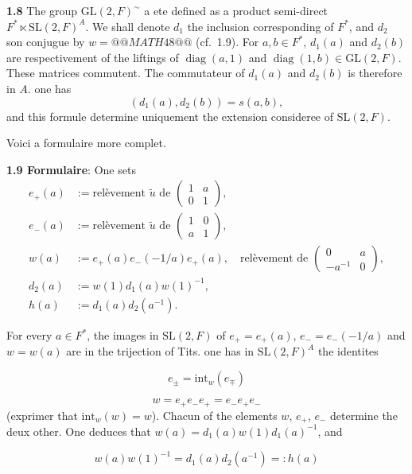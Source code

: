 \documentclass[12pt,a4paper]{article}
\theoremstyle{plain}
\theoremstyle{definition}
\theoremstyle{remark}
\DeclareMathOperator{\diag}{diag}
\newcommand{\wt}{\widetilde}
\begin{document}
\textbf{1.8} The group $\mathrm{GL}(2, F)^\sim$ a ete defined as a product semi-direct $F^* \ltimes \mathrm{SL}(2, F)^A$. We shall denote $d_1$ the inclusion corresponding of $F^*$, and $d_2$ son conjugue by $w = @@MATH48@@$ (cf.\ 1.9). For $a, b \in F^*$, $d_1(a)$ and $d_2(b)$ are respectivement of the liftings of $\diag(a, 1)$ and $\diag(1, b) \in \mathrm{GL}(2, F)$. These matrices commutent. The commutateur of $d_1(a)$ and $d_2(b)$ is therefore in $A$. one has
\[
(d_1(a), d_2(b)) = s(a, b),
\]
and this formule determine uniquement the extension consideree of $\mathrm{SL}(2, F)$.

Voici a formulaire more complet.

\textbf{1.9 Formulaire}: One sets
\begin{align*}
e_+(a) &:= \text{relèvement } \wt{u} \text{ de } \begin{pmatrix} 1 & a \\ 0 & 1 \end{pmatrix},\\
e_-(a) &:= \text{relèvement } \wt{u} \text{ de } \begin{pmatrix} 1 & 0 \\ a & 1 \end{pmatrix},\\
w(a) &:= e_+(a) e_-(-1/a) e_+(a), \quad \text{relèvement de } \begin{pmatrix} 0 & a \\ -a^{-1} & 0 \end{pmatrix},\\
d_2(a) &:= w(1) d_1(a) w(1)^{-1},\\
h(a) &:= d_1(a) d_2(a^{-1}).
\end{align*}

For every $a \in F^*$, the images in $\mathrm{SL}(2, F)$ of $e_+ = e_+(a)$, $e_- = e_-(-1/a)$ and $w = w(a)$ are in the trijection of Tits. one has in $\mathrm{SL}(2, F)^A$ the identites

\begin{equation}\label{eq:1.9.1}
e_\pm = \mathrm{int}_w(e_\mp)
\tag{1.9.1}
\end{equation}

\begin{equation}\label{eq:1.9.2}
w = e_+ e_- e_+ = e_- e_+ e_-
\tag{1.9.2}
\end{equation}
(exprimer that $\mathrm{int}_w(w) = w$). Chacun of the elements $w$, $e_+$, $e_-$ determine the deux other. One deduces that $w(a) = d_1(a) w(1) d_1(a)^{-1}$, and

\begin{equation}\label{eq:1.9.3}
w(a) w(1)^{-1} = d_1(a) d_2(a^{-1}) =: h(a)
\tag{1.9.3}
\end{equation}
\end{document}
